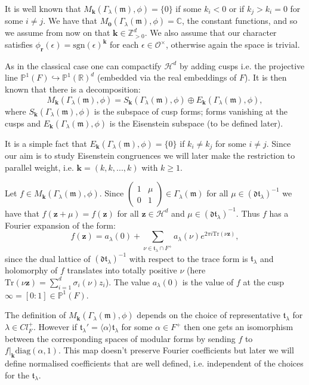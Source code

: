 \documentclass[a4paper,oneside]{amsart}
\theoremstyle{plain}
\theoremstyle{definition}
\begin{document}
It is well known that $M_{\textbf{k}}(\Gamma_{\lambda}(\mathfrak{m}),\phi) = \{0\}$ if some $k_i < 0$ or if $k_j > k_i = 0$ for some $i\neq j$. We have that $M_{\textbf{0}}(\Gamma_{\lambda}(\mathfrak{m}),\phi) = \mathbb{C}$, the constant functions, and so we assume from now on that $\textbf{k}\in\mathbb{Z}^d_{> 0}$. We also assume that our character satisfies $\phi_{\textbf{r}}(\epsilon) = \text{sgn}(\epsilon)^{\textbf{k}}$ for each $\epsilon\in\mathcal{O}^{\times}$, otherwise again the space is trivial.

As in the classical case one can compactify $\mathcal{H}^d$ by adding cusps i.e. the projective line $\mathbb{P}^1(F)\hookrightarrow\mathbb{P}^1(\mathbb{R})^d$ (embedded via the real embeddings of $F$). It is then known that there is a decomposition: \[M_{\textbf{k}}(\Gamma_\lambda(\mathfrak{m}),\phi) = S_{\textbf{k}}(\Gamma_{\lambda}(\mathfrak{m}),\phi) \oplus E_{\textbf{k}}(\Gamma_{\lambda}(\mathfrak{m}),\phi),\] where $S_{\textbf{k}}(\Gamma_{\lambda}(\mathfrak{m}),\phi)$ is the subspace of cusp forms; forms vanishing at the cusps and $E_{\textbf{k}}(\Gamma_{\lambda}(\mathfrak{m}),\phi)$ is the Eisenstein subspace (to be defined later).

It is a simple fact that $E_{\textbf{k}}(\Gamma_{\lambda}(\mathfrak{m}),\phi) = \{0\}$ if $k_i \ne k_j$ for some $i\ne j$. Since our aim is to study Eisenstein congruences we will later make the restriction to parallel weight, i.e. $\textbf{k} = (k,k,...,k)$ with $k \geq 1$.

Let $f\in M_{\textbf{k}}(\Gamma_\lambda(\mathfrak{m}),\phi)$. Since $\left(\begin{array}{cc}1 & \mu \\ 0 & 1\end{array}\right)\in\Gamma_{\lambda}(\mathfrak{m})$ for all $\mu\in(\mathfrak{dt}_{\lambda})^{-1}$ we have that $f(\textbf{z}+\mu) = f(\textbf{z})$ for all $\textbf{z}\in\mathcal{H}^d$ and $\mu\in (\mathfrak{dt}_{\lambda})^{-1}$. Thus $f$ has a Fourier expansion of the form: \[f(\textbf{z}) = a_\lambda(0) + \sum_{\nu\in \mathfrak{t}_{\lambda}\cap F^{+}} a_{\lambda}(\nu) e^{2\pi i\text{Tr}(\nu\textbf{z})},\] since the dual lattice of $(\mathfrak{dt}_{\lambda})^{-1}$ with respect to the trace form is $\mathfrak{t}_{\lambda}$ and holomorphy of $f$ translates into totally positive $\nu$ (here $\text{Tr}(\nu\textbf{z}) = \sum_{i=1}^d \sigma_i(\nu)z_i$). The value $a_\lambda(0)$ is the value of $f$ at the cusp $\infty = [0 : 1]\in\mathbb{P}^1(F)$.

The definition of $M_{\textbf{k}}(\Gamma_{\lambda}(\mathfrak{m}),\phi)$ depends on the choice of representative $\mathfrak{t}_{\lambda}$ for $\lambda\in Cl_F^{+}$. However if $\mathfrak{t}_{\lambda}' = \langle \alpha\rangle \mathfrak{t}_{\lambda}$ for some $\alpha\in F^+$ then one gets an isomorphism between the corresponding spaces of modular forms by sending $f$ to $f|_{\textbf{k}}\text{diag}(\alpha,1)$. This map doesn't preserve Fourier coefficients but later we will define normalised coefficients that are well defined, i.e. independent of the choices for the $\mathfrak{t}_{\lambda}$.
\end{document}
